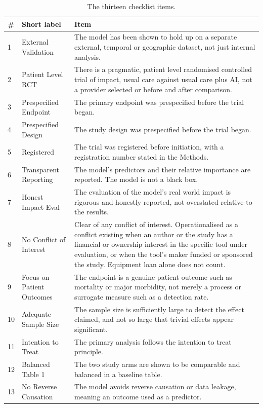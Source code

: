 \documentclass{article}
\begin{document}
\begin{table}[h]
  \caption{The thirteen checklist items.}
  \label{tab:items}
  \centering
  \small
  \begin{tabular}{p{0.4cm}p{3.0cm}p{8.6cm}}
    \toprule
    \# & Short label & Item \\
    \midrule
    1  & External Validation      & The model has been shown to hold up on a separate external, temporal or geographic dataset, not just internal analysis. \\
    2  & Patient Level RCT        & There is a pragmatic, patient level randomised controlled trial of impact, usual care against usual care plus AI, not a provider selected or before and after comparison. \\
    3  & Prespecified Endpoint    & The primary endpoint was prespecified before the trial began. \\
    4  & Prespecified Design      & The study design was prespecified before the trial began. \\
    5  & Registered               & The trial was registered before initiation, with a registration number stated in the Methods. \\
    6  & Transparent Reporting    & The model's predictors and their relative importance are reported. The model is not a black box. \\
    7  & Honest Impact Eval       & The evaluation of the model's real world impact is rigorous and honestly reported, not overstated relative to the results. \\
    8  & No Conflict of Interest  & Clear of any conflict of interest. Operationalised as a conflict existing when an author or the study has a financial or ownership interest in the specific tool under evaluation, or when the tool's maker funded or sponsored the study. Equipment loan alone does not count. \\
    9  & Focus on Patient Outcomes & The endpoint is a genuine patient outcome such as mortality or major morbidity, not merely a process or surrogate measure such as a detection rate. \\
    10 & Adequate Sample Size     & The sample size is sufficiently large to detect the effect claimed, and not so large that trivial effects appear significant. \\
    11 & Intention to Treat       & The primary analysis follows the intention to treat principle. \\
    12 & Balanced Table 1         & The two study arms are shown to be comparable and balanced in a baseline table. \\
    13 & No Reverse Causation     & The model avoids reverse causation or data leakage, meaning an outcome used as a predictor. \\
    \bottomrule
  \end{tabular}
\end{table}
\end{document}
